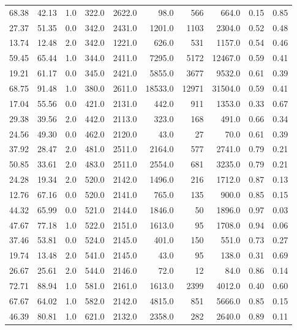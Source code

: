 \begin{table}
\begin{tabular}{rrrrrrrrrr}
68.38 &  42.13 &      1.0 &  322.0 & 2622.0 &    98.0 &   566 &   664.0 & 0.15 & 0.85 \\
27.37 &  51.35 &      0.0 &  342.0 & 2431.0 &  1201.0 &  1103 &  2304.0 & 0.52 & 0.48 \\
13.74 &  12.48 &      2.0 &  342.0 & 1221.0 &   626.0 &   531 &  1157.0 & 0.54 & 0.46 \\
59.45 &  65.44 &      1.0 &  344.0 & 2411.0 &  7295.0 &  5172 & 12467.0 & 0.59 & 0.41 \\
19.21 &  61.17 &      0.0 &  345.0 & 2421.0 &  5855.0 &  3677 &  9532.0 & 0.61 & 0.39 \\
68.75 &  91.48 &      1.0 &  380.0 & 2611.0 & 18533.0 & 12971 & 31504.0 & 0.59 & 0.41 \\
17.04 &  55.56 &      0.0 &  421.0 & 2131.0 &   442.0 &   911 &  1353.0 & 0.33 & 0.67 \\
29.38 &  39.56 &      2.0 &  442.0 & 2113.0 &   323.0 &   168 &   491.0 & 0.66 & 0.34 \\
24.56 &  49.30 &      0.0 &  462.0 & 2120.0 &    43.0 &    27 &    70.0 & 0.61 & 0.39 \\
37.92 &  28.47 &      2.0 &  481.0 & 2511.0 &  2164.0 &   577 &  2741.0 & 0.79 & 0.21 \\
50.85 &  33.61 &      2.0 &  483.0 & 2511.0 &  2554.0 &   681 &  3235.0 & 0.79 & 0.21 \\
24.28 &  19.34 &      2.0 &  520.0 & 2142.0 &  1496.0 &   216 &  1712.0 & 0.87 & 0.13 \\
12.76 &  67.16 &      0.0 &  520.0 & 2141.0 &   765.0 &   135 &   900.0 & 0.85 & 0.15 \\
44.32 &  65.99 &      0.0 &  521.0 & 2144.0 &  1846.0 &    50 &  1896.0 & 0.97 & 0.03 \\
47.67 &  77.18 &      1.0 &  522.0 & 2151.0 &  1613.0 &    95 &  1708.0 & 0.94 & 0.06 \\
37.46 &  53.81 &      0.0 &  524.0 & 2145.0 &   401.0 &   150 &   551.0 & 0.73 & 0.27 \\
19.74 &  13.48 &      2.0 &  541.0 & 2145.0 &    43.0 &    95 &   138.0 & 0.31 & 0.69 \\
26.67 &  25.61 &      2.0 &  544.0 & 2146.0 &    72.0 &    12 &    84.0 & 0.86 & 0.14 \\
72.71 &  88.94 &      1.0 &  581.0 & 2161.0 &  1613.0 &  2399 &  4012.0 & 0.40 & 0.60 \\
67.67 &  64.02 &      1.0 &  582.0 & 2142.0 &  4815.0 &   851 &  5666.0 & 0.85 & 0.15 \\
46.39 &  80.81 &      1.0 &  621.0 & 2132.0 &  2358.0 &   282 &  2640.0 & 0.89 & 0.11 \\

\end{tabular}
\end{table}
